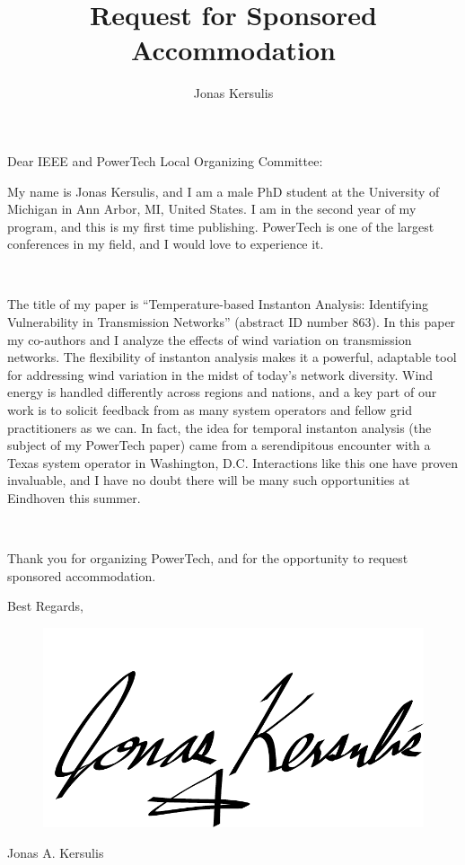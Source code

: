 \documentclass[12pt,letterpaper]{article}
\author{Jonas Kersulis}
\title{Request for Sponsored Accommodation}
\begin{document}
\noindent Dear IEEE and PowerTech Local Organizing Committee:
\vspace{20pt}

My name is Jonas Kersulis, and I am a male PhD student at the University of Michigan in Ann Arbor, MI, United States. I am in the second year of my program, and this is my first time publishing. PowerTech is one of the largest conferences in my field, and I would love to experience it.

\ 

The title of my paper is ``Temperature-based Instanton Analysis: Identifying Vulnerability in Transmission Networks'' (abstract ID number 863). In this paper my co-authors and I analyze the effects of wind variation on transmission networks. The flexibility of instanton analysis makes it a powerful, adaptable tool for addressing wind variation in the midst of today's network diversity. Wind energy is handled differently across regions and nations, and a key part of our work is to solicit feedback from as many system operators and fellow grid practitioners as we can. In fact, the idea for temporal instanton analysis (the subject of my PowerTech paper) came from a serendipitous encounter with a Texas system operator in Washington, D.C. Interactions like this one have proven invaluable, and I have no doubt there will be many such opportunities at Eindhoven this summer.

\ 

Thank you for organizing PowerTech, and for the opportunity to request sponsored accommodation.

\vspace{100pt}

\noindent Best Regards,
\begin{figure}[h!]
\includegraphics[trim=0in 0in 0in 0in, clip, width=0.3\linewidth]{../images/signature}
\label{fig:signature}
\end{figure}

Jonas A. Kersulis
\end{document}
